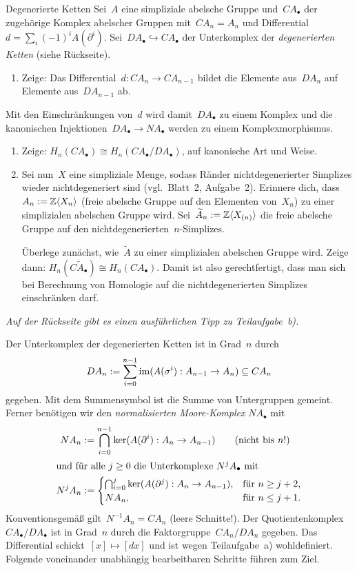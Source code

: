 \documentclass{uebblatt}
\begin{document}
\begin{aufgabe}{Degenerierte Ketten}
Sei~$A$ eine simpliziale abelsche Gruppe und~$CA_\bullet$ der zugehörige
Komplex abelscher Gruppen mit~$CA_n = A_n$ und Differential~$d = \sum_i (-1)^i
A(\partial^i)$. Sei~$DA_\bullet \hookrightarrow CA_\bullet$ der Unterkomplex
der \emph{degenerierten Ketten} (siehe Rückseite).
\begin{enumerate}
\item Zeige: Das Differential~$d : CA_n \to CA_{n-1}$ bildet die Elemente
aus~$DA_n$ auf Elemente aus~$DA_{n-1}$ ab.
\end{enumerate}
Mit den Einschränkungen von~$d$ wird damit~$DA_\bullet$ zu einem Komplex und die
kanonischen Injektionen~$DA_\bullet \to NA_\bullet$ werden zu einem Komplexmorphismus.
\begin{enumerate}
\addtocounter{enumi}{1}
\item Zeige: $H_n(CA_\bullet) \cong H_n(CA_\bullet/DA_\bullet)$, auf kanonische
Art und Weise.
\item Sei nun~$X$ eine simpliziale Menge, sodass Ränder nichtdegenerierter
Simplizes wieder nichtdegeneriert sind (vgl.~Blatt~2, Aufgabe~2). Erinnere
dich, dass~$A_n := \mathbb{Z}\langle X_n \rangle$ (freie abelsche Gruppe auf den
Elementen von~$X_n$) zu einer simplizialen abelschen Gruppe wird.
Sei~$\widetilde A_n := \mathbb{Z}\langle X_{(n)} \rangle$ die freie abelsche Gruppe
auf den nichtdegenerierten~$n$-Simplizes.

Überlege zunächst, wie~$\widetilde A$ zu einer simplizialen abelschen Gruppe wird.
Zeige dann: $H_n(C\widetilde A_\bullet) \cong H_n(CA_\bullet)$. Damit ist also
gerechtfertigt, dass man sich bei Berechnung von Homologie auf die
nichtdegenerierten Simplizes einschränken darf.
\end{enumerate}

\emph{Auf der Rückseite gibt es einen ausführlichen Tipp zu Teilaufgabe~b).}
\end{aufgabe}

Der Unterkomplex der degenerierten Ketten ist in Grad~$n$ durch
\[ DA_n := \sum_{i=0}^{n-1} \operatorname{im}(A(\sigma^i) : A_{n-1} \to A_n) \subseteq
CA_n \]
gegeben. Mit dem Summensymbol ist die Summe von Untergruppen gemeint. Ferner
benötigen wir den \emph{normalisierten Moore-Komplex} $NA_\bullet$ mit
\begin{align*}
  NA_n &:= \bigcap_{i=0}^{n-1} \operatorname{ker}(A(\partial^i) : A_n \to A_{n-1})
\qquad\text{(nicht bis~$n$!)} \\
\intertext{und für alle~$j \geq 0$ die Unterkomplexe~$N^jA_\bullet$ mit}
  N^jA_n &:= \begin{cases}
  \bigcap_{i=0}^j \operatorname{ker}(A(\partial^j) : A_n \to A_{n-1}), &
  \text{für~$n \geq j + 2$,} \\
  NA_n, &
  \text{für~$n \leq j + 1$.} \end{cases}
\end{align*}
Konventionsgemäß gilt~$N^{-1}A_n = CA_n$ (leere Schnitte!).
Der Quotientenkomplex~$CA_\bullet/DA_\bullet$ ist in Grad~$n$ durch die
Faktorgruppe~$CA_n/DA_n$ gegeben. Das Differential schickt~$[x] \mapsto [dx]$
und ist wegen Teilaufgabe~a) wohldefiniert. Folgende voneinander unabhängig
bearbeitbaren Schritte führen zum Ziel.
\end{document}
